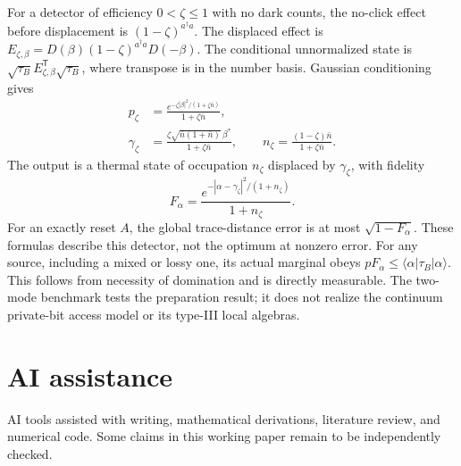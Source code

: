 \documentclass[11pt,a4paper]{article}
\begin{document}
For a detector of efficiency $0<\zeta\le1$ with no dark counts, the
no-click effect before displacement is $(1-\zeta)^{a^\dagger a}$.
The displaced effect is
$E_{\zeta,\beta}=D(\beta)(1-\zeta)^{a^\dagger a}D(-\beta)$.
The conditional unnormalized state is
$\sqrt{\tau_B}E_{\zeta,\beta}^{\mathsf T}\sqrt{\tau_B}$,
where transpose is in the number basis. Gaussian conditioning gives
\begin{align}
p_\zeta&=\frac{e^{-\zeta|\beta|^2/(1+\zeta\bar n)}}{1+\zeta\bar n},\\
\gamma_\zeta&=\frac{\zeta\sqrt{\bar n(1+\bar n)}\,\beta^*}{1+\zeta\bar n},\qquad
n_\zeta=\frac{(1-\zeta)\bar n}{1+\zeta\bar n}.
\end{align}
The output is a thermal state of occupation $n_\zeta$ displaced by
$\gamma_\zeta$, with fidelity
\begin{equation}
F_\alpha=\frac{e^{-|\alpha-\gamma_\zeta|^2/(1+n_\zeta)}}{1+n_\zeta}.
\end{equation}
For an exactly reset $A$, the global trace-distance error is at most
$\sqrt{1-F_\alpha}$. These formulas describe this detector, not the optimum
at nonzero error. For any source, including a mixed or lossy one, its
actual marginal obeys $pF_\alpha\le\langle\alpha|\tau_B|\alpha\rangle$.
This follows from necessity of domination and is directly measurable.
The two-mode benchmark tests the preparation result; it does not realize
the continuum private-bit access model or its type-III local algebras.

\section*{AI assistance}
AI tools assisted with writing, mathematical derivations, literature review, and numerical code. Some claims in this working paper remain to be independently checked.



\end{document}
